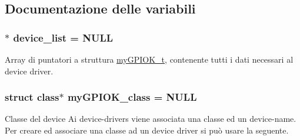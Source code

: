 \subsection{Documentazione delle variabili}
\hypertarget{group___linux-_driver_ga1deed297d5c8afeb9703965d37d3be5b}{
\subsubsection[{device\+\_\+list}]{$\ast$ device\+\_\+list = N\+U\+L\+L\hspace{0.3cm}{\ttfamily [static]}}}\label{group___linux-_driver_ga1deed297d5c8afeb9703965d37d3be5b}


Array di puntatori a struttura \hyperlink{structmy_g_p_i_o_k__t}{my\+G\+P\+I\+O\+K\+\_\+t}, contenente tutti i dati necessari al device driver. 

\hypertarget{group___linux-_driver_gaaf8d1bce7d6389684a037e94381c275c}{
\subsubsection[{my\+G\+P\+I\+O\+K\+\_\+class}]{\setlength{\rightskip}{0pt plus 5cm}struct class$\ast$ my\+G\+P\+I\+O\+K\+\_\+class = N\+U\+L\+L\hspace{0.3cm}{\ttfamily [static]}}}\label{group___linux-_driver_gaaf8d1bce7d6389684a037e94381c275c}


Classe del device Ai device-\/drivers viene associata una classe ed un device-\/name. Per creare ed associare una classe ad un device driver si può usare la seguente. 


